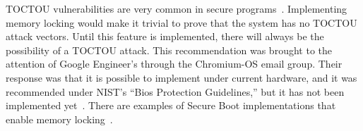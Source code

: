 TOCTOU vulnerabilities are very common in secure programs~\cite{tpm-toctou}.
Implementing memory locking would make it trivial to prove that the system has
no TOCTOU attack vectors. 
Until this feature is implemented, there will always be the possibility of a
TOCTOU attack.
This recommendation was brought to the attention of Google Engineer's through
the Chromium-OS email group.
Their response was that it is possible to implement under current hardware, and
it was recommended under NIST's ``Bios Protection Guidelines,'' but it has not
been implemented yet~\cite{cooper2011bios}.
There are examples of Secure Boot implementations that enable memory locking~\cite{elane}.

% 
